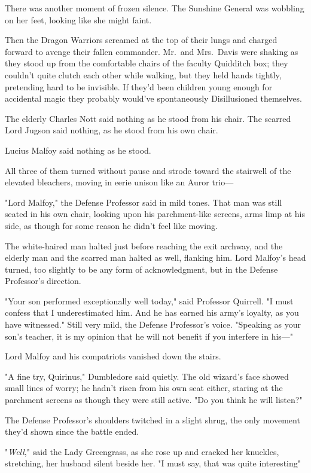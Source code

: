There was another moment of frozen silence. The Sunshine General was wobbling
on her feet, looking like she might faint.

Then the Dragon Warriors screamed at the top of their lungs and charged forward
to avenge their fallen commander.
\sbreak
Mr.~and Mrs.~Davis were shaking as they stood up from the comfortable chairs of
the faculty Quidditch box; they couldn't quite clutch each other while walking,
but they held hands tightly, pretending hard to be invisible. If they'd been
children young enough for accidental magic they probably would've spontaneously
Disillusioned themselves.

The elderly Charles Nott said nothing as he stood from his chair. The scarred
Lord Jugson said nothing, as he stood from his own chair.

Lucius Malfoy said nothing as he stood.

All three of them turned without pause and strode toward the stairwell of the
elevated bleachers, moving in eerie unison like an Auror trio---

"Lord Malfoy," the Defense Professor said in mild tones. That man was still
seated in his own chair, looking upon his parchment-like screens, arms limp at
his side, as though for some reason he didn't feel like moving.

The white-haired man halted just before reaching the exit archway, and the
elderly man and the scarred man halted as well, flanking him. Lord Malfoy's
head turned, too slightly to be any form of acknowledgment, but in the Defense
Professor's direction.

"Your son performed exceptionally well today," said Professor Quirrell. "I must
confess that I underestimated him. And he has earned his army's loyalty, as you
have witnessed." Still very mild, the Defense Professor's voice. "Speaking as
your son's teacher, it is my opinion that he will not benefit if you interfere
in his---"

Lord Malfoy and his compatriots vanished down the stairs.

"A fine try, Quirinus," Dumbledore said quietly. The old wizard's face showed
small lines of worry; he hadn't risen from his own seat either, staring at the
parchment screens as though they were still active. "Do you think he will
listen?"

The Defense Professor's shoulders twitched in a slight shrug, the only movement
they'd shown since the battle ended.

"\emph{Well}," said the Lady Greengrass, as she rose up and cracked her
knuckles, stretching, her husband silent beside her. "I must say, that was
quite{\el} interesting{\el}"

